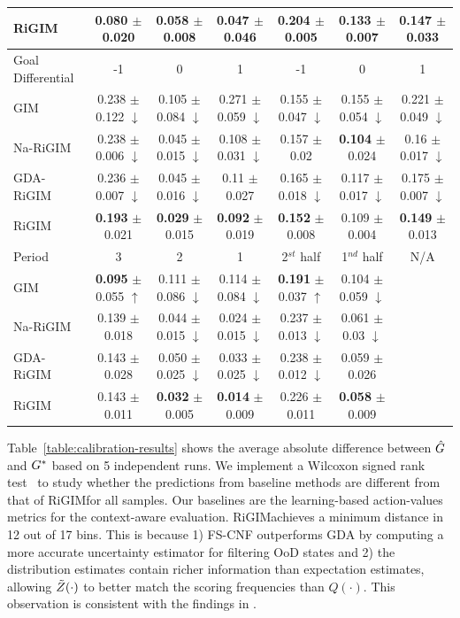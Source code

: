 \documentclass{article}
\newcommand{\sys}{RiGIM}
\newcommand{\goal}{g}
\newcommand{\system}{\sys\;}
\begin{document}
\begin{table}[htbp]
{\begin{tabular}{l|ccc:ccc}
RiGIM & {\bf 0.080} $\pm$ 0.020 & {\bf 0.058} $\pm$ 0.008 & 0.047 $\pm$ 0.046 & {\bf 0.204} $\pm$ 0.005 & 0.133 $\pm$ 0.007 & {\bf 0.147} $\pm$ 0.033\\ \hline\hline
 Goal Differential & -1 & 0 & 1 & -1 & 0 & 1 \\\hline
GIM  & 0.238 $\pm$ 0.122 $\downarrow$ & 0.105 $\pm$ 0.084 $\downarrow$ & 0.271 $\pm$ 0.059 $\downarrow$ & 0.155 $\pm$ 0.047 $\downarrow$ & 0.155 $\pm$ 0.054 $\downarrow$ & 0.221 $\pm$ 0.049 $\downarrow$ \\
Na-RiGIM  & 0.238 $\pm$ 0.006 $\downarrow$ & 0.045 $\pm$ 0.015 $\downarrow$ & 0.108 $\pm$ 0.031 $\downarrow$ & 0.157 $\pm$ 0.02 & {\bf 0.104} $\pm$ 0.024 & 0.16 $\pm$ 0.017 $\downarrow$\\
GDA-RiGIM & 0.236 $\pm$ 0.007 $\downarrow$ & 0.045 $\pm$ 0.016 $\downarrow$ & 0.11 $\pm$ 0.027 & 0.165 $\pm$ 0.018 $\downarrow$ & 0.117 $\pm$ 0.017 $\downarrow$ & 0.175 $\pm$ 0.007 $\downarrow$\\
RiGIM & {\bf 0.193} $\pm$ 0.021 & {\bf 0.029} $\pm$ 0.015 & {\bf 0.092} $\pm$ 0.019 & {\bf 0.152} $\pm$ 0.008 & 0.109 $\pm$ 0.004 & {\bf 0.149} $\pm$ 0.013\\ \hline\hline
Period & 3 & 2 & 1 & 2$^{st}$ half
& 1$^{nd}$ half & N/A \\\hline
GIM & {\bf 0.095} $\pm$ 0.055 $\uparrow$ & 0.111 $\pm$ 0.086 $\downarrow$ & 0.114 $\pm$ 0.084 $\downarrow$ & {\bf 0.191} $\pm$ 0.037 $\uparrow$ & 0.104 $\pm$ 0.059 $\downarrow$ \\
Na-RiGIM  & 0.139 $\pm$ 0.018 & 0.044 $\pm$ 0.015 $\downarrow$ & 0.024 $\pm$ 0.015 $\downarrow$ & 0.237 $\pm$ 0.013 $\downarrow$ & 0.061 $\pm$ 0.03 $\downarrow$ \\
GDA-RiGIM & 0.143 $\pm$ 0.028 & 0.050 $\pm$ 0.025 $\downarrow$ & 0.033 $\pm$ 0.025 $\downarrow$ & 0.238 $\pm$ 0.012 $\downarrow$ & 0.059 $\pm$ 0.026\\
RiGIM & 0.143 $\pm$ 0.011 & {\bf 0.032} $\pm$ 0.005 & {\bf 0.014} $\pm$ 0.009  & 0.226 $\pm$ 0.011 & {\bf 0.058} $\pm$ 0.009\\ \bottomrule
\end{tabular}
}
\end{table}
Table~\ref{table:calibration-results} shows the average absolute difference between $\hat{\MakeUppercase{\goal}}$ and $\MakeUppercase{\goal}^{*}$ based on 5 independent runs. 
We implement a Wilcoxon signed rank test~\cite{conover1999practical} to study whether the predictions from baseline methods are different from that of \system for all samples.
Our baselines are the learning-based action-values metrics for the context-aware evaluation. \system achieves a minimum distance in 12 out of 17 bins. This is because 1) FS-CNF outperforms GDA by computing a more accurate uncertainty estimator for filtering OoD states and 2) the distribution estimates contain richer information than expectation estimates, allowing $\Tilde{Z}(\cdot)$ to better match the scoring frequencies than $Q(\cdot)$. This observation is consistent with the findings in \cite{bellemare2017distributional}.
\end{document}
